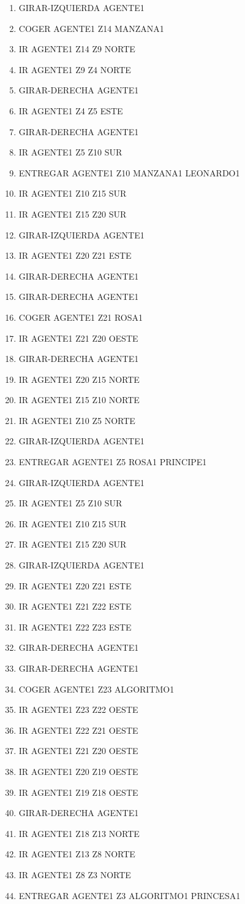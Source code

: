 \documentclass[12pt,a4paper]{article}
\begin{document}
\begin{enumerate}
	\item GIRAR-IZQUIERDA AGENTE1
	\item COGER AGENTE1 Z14 MANZANA1
	\item IR AGENTE1 Z14 Z9 NORTE
	\item IR AGENTE1 Z9 Z4 NORTE
	\item GIRAR-DERECHA AGENTE1
	\item IR AGENTE1 Z4 Z5 ESTE
	\item GIRAR-DERECHA AGENTE1
	\item IR AGENTE1 Z5 Z10 SUR
	\item ENTREGAR AGENTE1 Z10 MANZANA1 LEONARDO1
	\item IR AGENTE1 Z10 Z15 SUR
	\item IR AGENTE1 Z15 Z20 SUR
	\item GIRAR-IZQUIERDA AGENTE1
	\item IR AGENTE1 Z20 Z21 ESTE
	\item GIRAR-DERECHA AGENTE1
	\item GIRAR-DERECHA AGENTE1
	\item COGER AGENTE1 Z21 ROSA1
	\item IR AGENTE1 Z21 Z20 OESTE
	\item GIRAR-DERECHA AGENTE1
	\item IR AGENTE1 Z20 Z15 NORTE
	\item IR AGENTE1 Z15 Z10 NORTE
	\item IR AGENTE1 Z10 Z5 NORTE
	\item GIRAR-IZQUIERDA AGENTE1
	\item ENTREGAR AGENTE1 Z5 ROSA1 PRINCIPE1
	\item GIRAR-IZQUIERDA AGENTE1
	\item IR AGENTE1 Z5 Z10 SUR
	\item IR AGENTE1 Z10 Z15 SUR
	\item IR AGENTE1 Z15 Z20 SUR
	\item GIRAR-IZQUIERDA AGENTE1
	\item IR AGENTE1 Z20 Z21 ESTE
	\item IR AGENTE1 Z21 Z22 ESTE
	\item IR AGENTE1 Z22 Z23 ESTE
	\item GIRAR-DERECHA AGENTE1
	\item GIRAR-DERECHA AGENTE1
	\item COGER AGENTE1 Z23 ALGORITMO1
	\item IR AGENTE1 Z23 Z22 OESTE
	\item IR AGENTE1 Z22 Z21 OESTE
	\item IR AGENTE1 Z21 Z20 OESTE
	\item IR AGENTE1 Z20 Z19 OESTE
	\item IR AGENTE1 Z19 Z18 OESTE
	\item GIRAR-DERECHA AGENTE1
	\item IR AGENTE1 Z18 Z13 NORTE
	\item IR AGENTE1 Z13 Z8 NORTE
	\item IR AGENTE1 Z8 Z3 NORTE
	\item ENTREGAR AGENTE1 Z3 ALGORITMO1 PRINCESA1
\end{enumerate}
\end{document}

